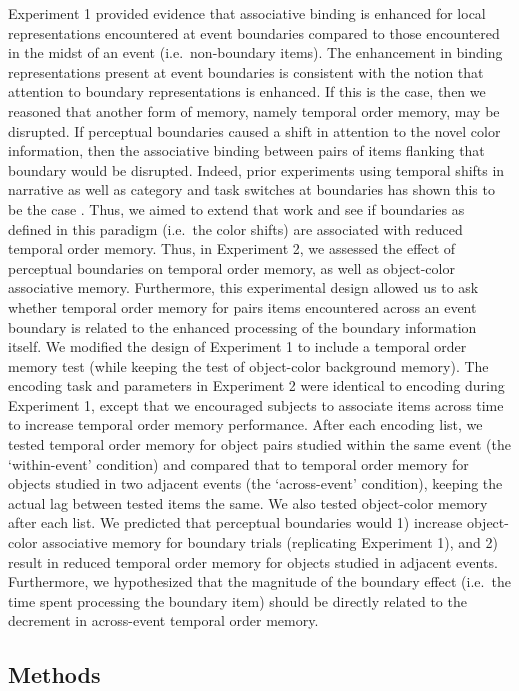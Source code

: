 Experiment 1 provided evidence that associative binding is enhanced for
local representations encountered at event boundaries compared to those
encountered in the midst of an event (i.e.~non-boundary items). The
enhancement in binding representations present at event boundaries is
consistent with the notion that attention to boundary representations is
enhanced. If this is the case, then we reasoned that another form of
memory, namely temporal order memory, may be disrupted. If perceptual
boundaries caused a shift in attention to the novel color information,
then the associative binding between pairs of items flanking that
boundary would be disrupted. Indeed, prior experiments using temporal
shifts in narrative as well as category and task switches at boundaries
has shown this to be the case
\autocites{dubrow_influence_2013}{ezzyat_what_2011}{ezzyat_similarity_2014}.
Thus, we aimed to extend that work and see if boundaries as defined in
this paradigm (i.e.~the color shifts) are associated with reduced
temporal order memory. Thus, in Experiment 2, we assessed the effect of
perceptual boundaries on temporal order memory, as well as object-color
associative memory. Furthermore, this experimental design allowed us to
ask whether temporal order memory for pairs items encountered across an
event boundary is related to the enhanced processing of the boundary
information itself. We modified the design of Experiment 1 to include a
temporal order memory test (while keeping the test of object-color
background memory). The encoding task and parameters in Experiment 2
were identical to encoding during Experiment 1, except that we
encouraged subjects to associate items across time to increase temporal
order memory performance. After each encoding list, we tested temporal
order memory for object pairs studied within the same event (the
`within-event' condition) and compared that to temporal order memory for
objects studied in two adjacent events (the `across-event' condition),
keeping the actual lag between tested items the same. We also tested
object-color memory after each list. We predicted that perceptual
boundaries would 1) increase object-color associative memory for
boundary trials (replicating Experiment 1), and 2) result in reduced
temporal order memory for objects studied in adjacent events.
Furthermore, we hypothesized that the magnitude of the boundary effect
(i.e.~the time spent processing the boundary item) should be directly
related to the decrement in across-event temporal order memory.

\subsection{Methods}\label{methods-1}

